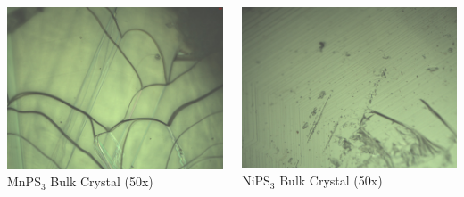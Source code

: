 \begin{frame}
	\begin{columns}
		\centering
		\includegraphics[width=\textwidth]{../figures/sample_photos/i001_MnPS3_50x_a.png}
		MnPS$_3$ Bulk Crystal (50x)

		\centering
		\includegraphics[width=\textwidth]{../figures/sample_photos/i005_NiPS3_50x.png}
		NiPS$_3$ Bulk Crystal (50x)


\end{columns}
\end{frame}
